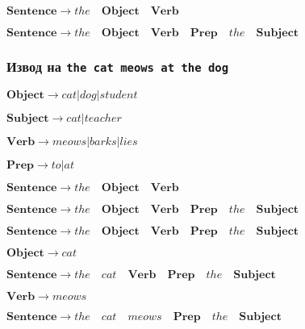 \documentclass{beamer}
\begin{document}
\begin{frame}[fragile]
\begin{frame}[fragile]
$\mathbf{Sentence} \rightarrow the  \quad \mathbf{Object} \quad  \mathbf{Verb}$

$\mathbf{Sentence} \rightarrow the \quad \mathbf{Object}  \quad\mathbf{Verb}  \quad\mathbf{Prep} \quad the \quad \mathbf{Subject}$



\end{frame}


\begin{frame}[fragile]
\frametitle{Извод на \texttt{the cat meows at the dog}}


\begin{flushright}


$\mathbf{Object} \rightarrow cat | dog | student$

$\mathbf{Subject} \rightarrow cat | teacher$

$\mathbf{Verb} \rightarrow meows | barks | lies$

$\mathbf{Prep} \rightarrow to | at$

$\mathbf{Sentence} \rightarrow the  \quad \mathbf{Object} \quad  \mathbf{Verb}$

$\mathbf{Sentence} \rightarrow the \quad \mathbf{Object}  \quad\mathbf{Verb}  \quad\mathbf{Prep} \quad the \quad \mathbf{Subject}$

\end{flushright}


\vspace{0.2cm}
\pause

$\mathbf{Sentence} \rightarrow the \quad \mathbf{Object}  \quad\mathbf{Verb}  \quad\mathbf{Prep} \quad the \quad \mathbf{Subject}$

\pause

\begin{flushright}
$\mathbf{Object} \rightarrow cat$
\end{flushright}

$\mathbf{Sentence} \rightarrow the \quad cat \quad\mathbf{Verb}  \quad\mathbf{Prep} \quad the \quad \mathbf{Subject}$



\pause

\begin{flushright}
$\mathbf{Verb} \rightarrow meows$
\end{flushright}

$\mathbf{Sentence} \rightarrow the \quad cat \quad meows  \quad\mathbf{Prep} \quad the \quad \mathbf{Subject}$


\end{frame}
\end{frame}
\end{document}
